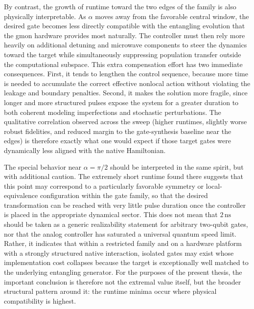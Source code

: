 By contrast, the growth of runtime toward the two edges of the family is also physically interpretable. As \(\alpha\) moves away from the favorable central window, the desired gate becomes less directly compatible with the entangling evolution that the gmon hardware provides most naturally. The controller must then rely more heavily on additional detuning and microwave components to steer the dynamics toward the target while simultaneously suppressing population transfer outside the computational subspace. This extra compensation effort has two immediate consequences. First, it tends to lengthen the control sequence, because more time is needed to accumulate the correct effective nonlocal action without violating the leakage and boundary penalties. Second, it makes the solution more fragile, since longer and more structured pulses expose the system for a greater duration to both coherent modeling imperfections and stochastic perturbations. The qualitative correlation observed across the sweep (higher runtimes, slightly worse robust fidelities, and reduced margin to the gate-synthesis baseline near the edges) is therefore exactly what one would expect if those target gates were dynamically less aligned with the native Hamiltonian.

The special behavior near \(\alpha=\pi/2\) should be interpreted in the same spirit, but with additional caution. The extremely short runtime found there suggests that this point may correspond to a particularly favorable symmetry or local-equivalence configuration within the gate family, so that the desired transformation can be reached with very little pulse duration once the controller is placed in the appropriate dynamical sector. This does not mean that \(2\,\mathrm{ns}\) should be taken as a generic realizability statement for arbitrary two-qubit gates, nor that the analog controller has saturated a universal quantum speed limit. Rather, it indicates that within a restricted family and on a hardware platform with a strongly structured native interaction, isolated gates may exist whose implementation cost collapses because the target is exceptionally well matched to the underlying entangling generator. For the purposes of the present thesis, the important conclusion is therefore not the extremal value itself, but the broader structural pattern around it: the runtime minima occur where physical compatibility is highest.


